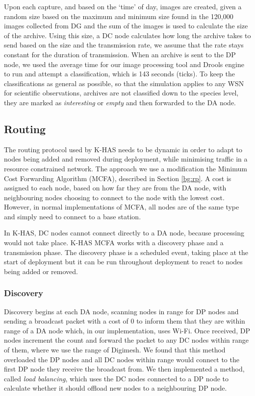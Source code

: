 Upon each capture, and based on the `time' of day, images are created, given a random size based on the maximum and minimum size found in the 120,000 images collected from DG and the sum of the images is used to calculate the size of the archive. Using this size, a DC node calculates how long the archive takes to send based on the size and the transmission rate, we assume that the rate stays constant for the duration of transmission.
When an archive is sent to the DP node, we used the average time for our image processing tool and Drools engine to run and attempt a classification, which is 143 seconds (ticks). To keep the classifications as general as possible, so that the simulation applies to any WSN for scientific observations, archives are not classified down to the species level, they are marked as \textit{interesting} or \textit{empty} and then forwarded to the DA node.

\subsection{Routing}
The routing protocol used by K-HAS needs to be dynamic in order to adapt to nodes being added and removed during deployment, while minimising traffic in a resource constrained network. The approach we use a modification the Minimum Cost Forwarding Algorithm (MCFA), described in Section \ref{bg:rp}. A cost is assigned to each node, based on how far they are from the DA node, with neighbouring nodes choosing to connect to the node with the lowest cost. However, in normal implementations of MCFA, all nodes are of the same type and simply need to connect to a base station.

In K-HAS, DC nodes cannot connect directly to a DA node, because processing would not take place. K-HAS MCFA works with a discovery phase and a transmission phase. The discovery phase is a scheduled event, taking place at the start of deployment but it can be run throughout deployment to react to nodes being added or removed. 

\subsubsection{Discovery}
	Discovery begins at each DA node, scanning nodes in range for DP nodes and sending a broadcast packet with a cost of 0 to inform them that they are within range of a DA node which, in our implementation, uses Wi-Fi. Once received, DP nodes increment the count and forward the packet to any DC nodes within range of them, where we use the range of Digimesh. We found that this method overloaded the DP nodes and all DC nodes within range would connect to the first DP node they receive the broadcast from. We then implemented a method, called \textit{load balancing}, which uses the DC nodes connected to a DP node to calculate whether it should offload new nodes to a neighbouring DP node.
	
